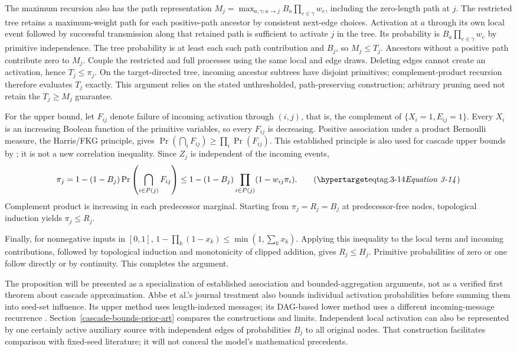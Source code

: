 The maximum recursion also has the path representation
$M_j=\max_{a,\gamma:a\rightarrow j}B_a\prod_{e\in\gamma}w_e$,
including the zero-length path at $j$. The restricted tree retains a
maximum-weight path for each positive-path ancestor by consistent next-edge
choices. Activation at $a$ through its own local event followed by successful
transmission along that retained path is sufficient to activate $j$ in the
tree. Its probability is $B_a\prod_{e\in\gamma}w_e$ by primitive independence.
The tree probability is at least each such path contribution and $B_j$, so
$M_j\le T_j$. Ancestors without a positive path contribute zero to $M_j$.
Couple the restricted and full processes using the same local and edge draws.
Deleting edges cannot create an activation, hence $T_j\le\pi_j$.
On the target-directed tree, incoming ancestor subtrees have disjoint
primitives; complement-product recursion therefore evaluates $T_j$ exactly.
This argument relies on the stated unthresholded, path-preserving construction;
arbitrary pruning need not retain the $T_j\ge M_j$ guarantee.

For the upper bound, let $F_{ij}$ denote failure of incoming activation
through $(i,j)$, that is, the complement of $\{X_i=1,E_{ij}=1\}$.
Every $X_i$ is an increasing Boolean function of the primitive variables,
so every $F_{ij}$ is decreasing. Positive association under a product
Bernoulli measure, the Harris/FKG principle, gives
$\Pr(\bigcap_iF_{ij})\ge\prod_i\Pr(F_{ij})$. This established principle
is also used for cascade upper bounds by \citet{abbe2017,abbe2020}; it is not a
new correlation inequality. Since $Z_j$ is independent of the incoming
events,
\[
\pi_j=1-(1-B_j)\Pr\left(\bigcap_{i\in P(j)}F_{ij}\right)
\le1-(1-B_j)\prod_{i\in P(j)}(1-w_{ij}\pi_i).
\eqtag{3-14}
\]
Complement product is increasing in each predecessor marginal.
Starting from $\pi_j=R_j=B_j$ at predecessor-free nodes, topological
induction yields $\pi_j\le R_j$.

Finally, for nonnegative inputs in $[0,1]$,
$1-\prod_k(1-x_k)\le\min(1,\sum_kx_k)$. Applying this inequality to
the local term and incoming contributions, followed by topological
induction and monotonicity of clipped addition, gives $R_j\le H_j$.
Primitive probabilities of zero or one follow directly or by continuity.
This completes the argument.

The proposition will be presented as a specialization of established
association and bounded-aggregation arguments, not as a verified first
theorem about cascade approximation. Abbe et al.'s journal treatment
also bounds individual activation probabilities before summing them into
seed-set influence. Its upper method uses length-indexed messages; its
DAG-based lower method uses a different incoming-message recurrence
\citep{abbe2020}. Section~\ref{cascade-bounds-prior-art} compares the
constructions and limits. Independent local activation
can also be represented by one certainly active auxiliary source with
independent edges of probabilities $B_j$ to all original nodes. That
construction facilitates comparison with fixed-seed literature; it will
not conceal the model's mathematical precedents.

